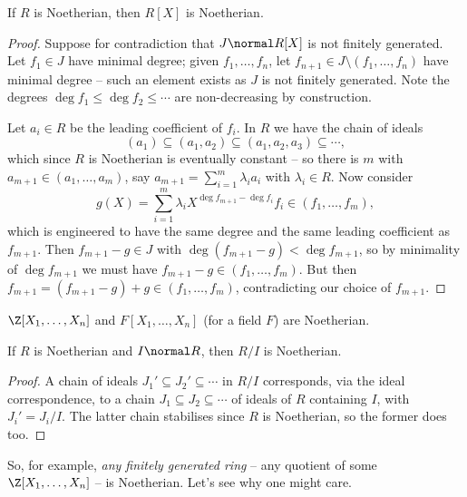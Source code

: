 \begin{theorem}
	If $R$ is Noetherian, then $R[X]$ is Noetherian.
\end{theorem}
\begin{proof}
	Suppose for contradiction that $J \normal R[X]$ is not finitely generated. Let $f_1 \in J$ have minimal degree; given $f_1, \dots, f_n$, let $f_{n + 1} \in J \setminus (f_1, \dots, f_n)$ have minimal degree -- such an element exists as $J$ is not finitely generated. Note the degrees $\deg f_1 \leq \deg f_2 \leq \cdots$ are non-decreasing by construction.

	Let $a_i \in R$ be the leading coefficient of $f_i$. In $R$ we have the chain of ideals
	$$
	(a_1) \subseteq (a_1, a_2) \subseteq (a_1, a_2, a_3) \subseteq \cdots,
	$$
	which since $R$ is Noetherian is eventually constant -- so there is $m$ with $a_{m + 1} \in (a_1, \dots, a_m)$, say $a_{m + 1} = \sum_{i = 1}^{m} \lambda_i a_i$ with $\lambda_i \in R$. Now consider
	$$
	g(X) = \sum_{i = 1}^{m} \lambda_i X^{\deg f_{m + 1} - \deg f_i} f_i \in (f_1, \dots, f_m),
	$$
	which is engineered to have the same degree and the same leading coefficient as $f_{m + 1}$. Then $f_{m+1} - g \in J$ with $\deg(f_{m + 1} - g) < \deg f_{m + 1}$, so by minimality of $\deg f_{m+1}$ we must have $f_{m + 1} - g \in (f_1, \dots, f_m)$. But then $f_{m + 1} = (f_{m+1} - g) + g \in (f_1, \dots, f_m)$, contradicting our choice of $f_{m + 1}$.
\end{proof}

\begin{corollary}
	$\Z[X_1, \dots, X_n]$ and $F[X_1, \dots, X_n]$ (for a field $F$) are Noetherian.
\end{corollary}

\begin{lemma}
	If $R$ is Noetherian and $I \normal R$, then $R/I$ is Noetherian.
\end{lemma}
\begin{proof}
	A chain of ideals $J_1' \subseteq J_2' \subseteq \cdots$ in $R/I$ corresponds, via the ideal correspondence, to a chain $J_1 \subseteq J_2 \subseteq \cdots$ of ideals of $R$ containing $I$, with $J_i' = J_i/I$. The latter chain stabilises since $R$ is Noetherian, so the former does too.
\end{proof}

So, for example, \emph{any finitely generated ring} -- any quotient of some $\Z[X_1, \dots, X_n]$ -- is Noetherian. Let's see why one might care.


